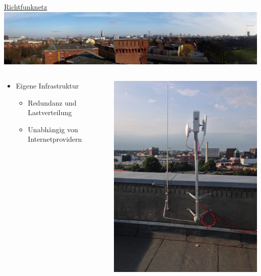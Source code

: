 \documentclass[t]{beamer}
\begin{document}
  \begin{frame}{\href{https://wiki.freifunk.net/Freifunk_Hamburg/Richtfunknetz}{Richtfunknetz}}
    \includegraphics[width=\textwidth]{Bilder/fux}
    \begin{columns}
      \begin{column}{0.7\textwidth}
  \begin{itemize}
    \item Eigene Infrastruktur
    \begin{itemize}
      \item Redundanz und Lastverteilung
      \item Unabhängig von Internetprovidern
    \end{itemize}
  \end{itemize}
      \end{column}
      \begin{column}{0.3\textwidth}
        \begin{center}
          \includegraphics[width=.9\textwidth]{Bilder/richtfunkmast}
        \end{center}
      \end{column}
    \end{columns}
  \end{frame}
\end{document}
